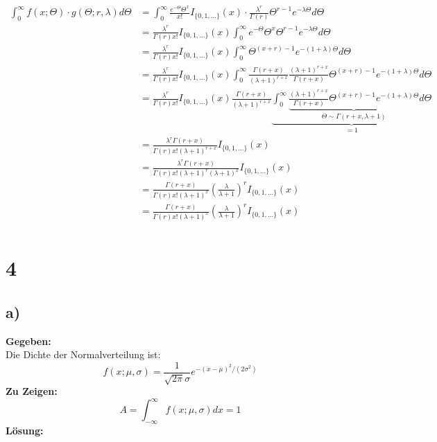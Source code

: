 \documentclass{article}
\begin{document}
\begin{align*}
    \int_{0}^{\infty} f(x; \Theta) \cdot g(\Theta; r, \lambda) d\Theta &= \int_{0}^{\infty}\frac{e^{-\Theta}\Theta^{x}}{x!} I_{\{0,1,...\}}(x) \cdot \frac{\lambda^r}{\Gamma(r)}\Theta^{r-1} e^{-\lambda\Theta} d\Theta\\
    &= \frac{\lambda^r }{\Gamma(r)x!} I_{\{0,1,...\}}(x) \int_{0}^{\infty} e^{-\Theta}\Theta^{x} \Theta^{r-1}e^{-\lambda \Theta} d \Theta \\
    &= \frac{\lambda^r }{\Gamma(r)x!} I_{\{0,1,...\}}(x) \int_{0}^{\infty} \Theta^{(x+r)-1} e^{-(1+ \lambda)\Theta} d\Theta \\
    &= \frac{\lambda^r}{\Gamma(r)x!} I_{\{0,1,...\}}(x) \int_{0}^{\infty} \frac{\Gamma(r+x)}{(\lambda + 1)^{r+x}}\frac{(\lambda + 1)^{r+x}}{\Gamma(r+x)} \Theta^{(x+r)-1} e^{-(1+ \lambda)\Theta} d\Theta \\
    &= \frac{\lambda^r}{\Gamma(r)x!} I_{\{0,1,...\}}(x) \frac{\Gamma(r+x)}{(\lambda + 1)^{r+x}} \underbrace{\int_{0}^{\infty}\underbrace{\frac{(\lambda + 1)^{r+x}}{\Gamma(r+x)} \Theta^{(x+r)-1} e^{-(1+ \lambda)\Theta}}_{\Theta \sim \Gamma(r+x, \lambda +1)} d \Theta}_{= 1} \\
    &= \frac{\lambda^r \Gamma(r+x)}{\Gamma(r)x! (\lambda+1)^{r+x}} I_{\{0,1,...\}}(x) \\
    &= \frac{\lambda^r \Gamma(r + x)}{\Gamma(r) x! (\lambda + 1)^{r} (\lambda + 1)^{x}} I_{\{0,1,...\}}(x) \\
    &= \frac{\Gamma(r + x)}{\Gamma(r)x!(\lambda+1)^x} \left(\frac{\lambda}{\lambda+1}\right)^r I_{\{0,1,...\}}(x) \\
    &= \frac{\Gamma(r + x)}{\Gamma(r)x!(\lambda+1)^x} \left(\frac{\lambda}{\lambda + 1}\right)^r I_{\{0,1,...\}}(x) \\
\end{align*}

\section*{4}
\subsection*{a)}
\textbf{Gegeben:}\\

Die Dichte der Normalverteilung ist:
\[f(x; \mu, \sigma) = \frac{1}{\sqrt{2\pi }\sigma} e^{-(x-\mu)^2/(2\sigma^2)}\]
\textbf{Zu Zeigen:}\\

\[A = \int_{-\infty}^{\infty}f(x; \mu, \sigma)dx = 1\] 
\textbf{Lösung:} \\
\end{document}
